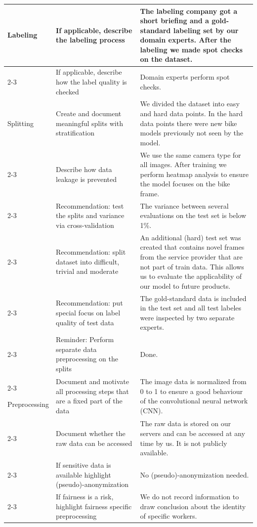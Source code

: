{\begin{longtable}{p{0.15\linewidth}|p{0.35\linewidth}p{0.5\linewidth}}
    \hline
    Labeling        
        & If applicable, describe the labeling process              
        &  The labeling company got a short briefing and a gold-standard labeling set by our domain experts. After the labeling we made spot checks on the dataset.        \\\cline{2-3}  
        & If applicable, describe how the label quality is checked  &  Domain experts perform spot checks. \\
            
    \hline
    Splitting        
        & Create and document meaningful splits with stratification                     & We divided the dataset into easy and hard data points. In the hard data points there were new bike models previously not seen by the model.\\\cline{2-3}  
        & Describe how data leakage is prevented                                        & We use the same camera type for all images. After training we perform heatmap analysis to ensure the model focuses on the bike frame.              \\\cline{2-3}  
        & Recommendation: test the splits and variance via cross-validation             & The variance between several evaluations on the test set is below 1\%.    \\\cline{2-3}  
            
        \pagebreak
        \cline{2-3}  
        & Recommendation: split dataset into difficult, trivial and moderate              & An additional (hard) test set was created that contains novel frames from the service provider that are not part of train data. This allows us to evaluate the applicability of our model to future products. \\\cline{2-3}  
        & Recommendation: put special focus on label quality of test data            & The gold-standard data is included in the test set and all test labeles were inspected by two separate experts. \\\cline{2-3}  
        & Reminder: Perform separate data preprocessing on the splits & Done. \\\cline{2-3}  
              
    \hline
    Preprocessing        
        & Document and motivate all processing steps that are a fixed part of the data   &  The image data is normalized from 0 to 1 to ensure a good behaviour of the convolutional neural network (CNN). \\\cline{2-3}  
        & Document whether the raw data can be accessed                                 &  The raw data is stored on our servers and can be accessed at any time by us. It is not publicly available.          \\\cline{2-3}  
        & If sensitive data is available highlight (pseudo)-anonymization               & No (pseudo)-anonymization needed. \\\cline{2-3}  
        & If fairness is a risk, highlight fairness specific preprocessing             & We do not record information to draw conclusion about the identity of specific workers.\\
             

\end{longtable}}
